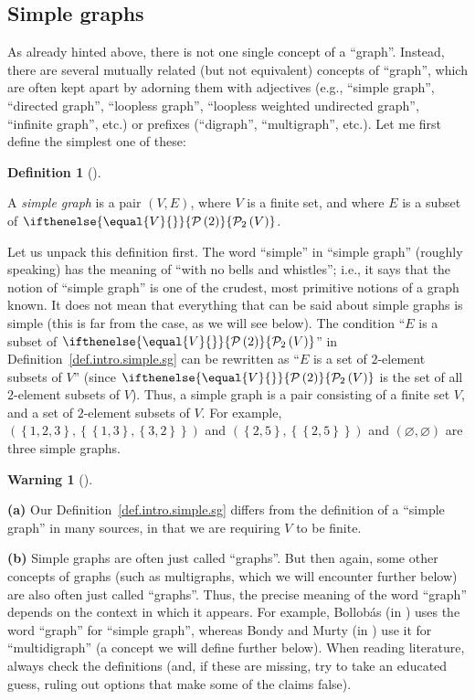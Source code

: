 \documentclass[numbers=enddot,12pt,final,onecolumn,notitlepage]{scrartcl}%
\theoremstyle{definition}
\newtheorem{defi}[theo]{Definition}
\newenvironment{definition}[1][]
{\begin{defi}[#1]\begin{leftbar}}
{\end{leftbar}\end{defi}}
\newtheorem{warn}[theo]{Warning}
\newenvironment{conclusion}[1][]
{\begin{warn}[#1]\begin{leftbar}}
{\end{leftbar}\end{warn}}
\newcommand{\powset}[2][]{\ifthenelse{\equal{#2}{}}{\mathcal{P}\left(#1\right)}{\mathcal{P}_{#1}\left(#2\right)}}
\newcommand{\set}[1]{\left\{ #1 \right\}}
\newcommand{\tup}[1]{\left( #1 \right)}
\begin{document}
\subsection{\label{sect.intro.simple}Simple graphs}

As already hinted above, there is not one single concept of a
``graph''. Instead, there are several mutually related (but not
equivalent) concepts of ``graph'', which are often kept apart by
adorning them with adjectives (e.g., ``simple graph'', ``directed
graph'', ``loopless graph'', ``loopless weighted undirected
graph'', ``infinite graph'', etc.) or prefixes (``digraph'',
``multigraph'', etc.). Let me first define the simplest one of these:

\begin{definition} \label{def.intro.simple.sg}
A \textit{simple graph} is a pair $\tup{V, E}$, where $V$ is a
finite set, and where $E$ is a subset of $\powset[2]{V}$.
\end{definition}

Let us unpack this definition first. The word ``simple'' in
``simple graph'' (roughly speaking) has the meaning of ``with no
bells and whistles''; i.e., it says that the notion of
``simple graph'' is one of the crudest, most primitive notions of
a graph known.
It does not mean
that everything that can be said about simple graphs is simple (this
is far from the case, as we will see below). The condition
``$E$ is a subset of $\powset[2]{V}$'' in
Definition~\ref{def.intro.simple.sg} can be rewritten as ``$E$ is a
set of $2$-element subsets of $V$'' (since $\powset[2]{V}$ is the set
of all $2$-element subsets of $V$). Thus, a simple graph is a pair
consisting of a finite set $V$, and a set of $2$-element subsets of
$V$.
For example,
$\left(\set{1,2,3}, \set{\set{1,3}, \set{3,2}} \right)$ and
$\left(\set{2,5}, \set{\set{2,5}}\right)$ and
$\left(\varnothing, \varnothing\right)$ are three simple graphs.

\begin{conclusion}
\textbf{(a)}
Our Definition~\ref{def.intro.simple.sg} differs from the definition
of a ``simple graph'' in many sources, in that we are requiring $V$ to
be finite.

\textbf{(b)}
Simple graphs are often just called ``graphs''. But then again, some
other concepts of graphs (such as multigraphs, which we will
encounter further below) are also often just called ``graphs''. Thus,
the precise meaning of the word ``graph'' depends on the context in
which it appears. For example, Bollob\'as (in \cite{Bollob79}) uses
the word ``graph'' for ``simple graph'', whereas Bondy and Murty
(in \cite{BonMur08}) use it for ``multidigraph'' (a concept we will
define further below). When reading literature, always check the
definitions (and, if these are missing, try to take an educated guess,
ruling out options that make some of the claims false).
\end{conclusion}
\end{document}
